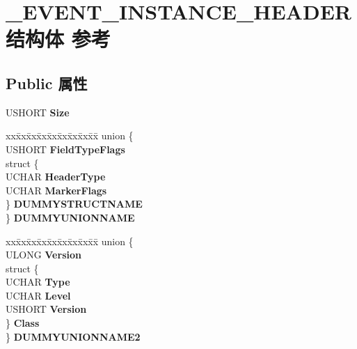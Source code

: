 \hypertarget{struct___e_v_e_n_t___i_n_s_t_a_n_c_e___h_e_a_d_e_r}{}\section{\+\_\+\+E\+V\+E\+N\+T\+\_\+\+I\+N\+S\+T\+A\+N\+C\+E\+\_\+\+H\+E\+A\+D\+E\+R结构体 参考}
\label{struct___e_v_e_n_t___i_n_s_t_a_n_c_e___h_e_a_d_e_r}
\subsection*{Public 属性}
\begin{DoxyCompactItemize}
\item 
\mbox{\label{struct___e_v_e_n_t___i_n_s_t_a_n_c_e___h_e_a_d_e_r_ae75f1a6dd8d0d347f318d45d325f159f}} 
U\+S\+H\+O\+RT {\bfseries Size}
\item 
\mbox{\label{struct___e_v_e_n_t___i_n_s_t_a_n_c_e___h_e_a_d_e_r_a184584d38a2dcb4fff67a9be91f792f4}} 
\begin{tabbing}
xx\=xx\=xx\=xx\=xx\=xx\=xx\=xx\=xx\=\kill
union \{\\
\>USHORT {\bfseries FieldTypeFlags}\\
\>struct \{\\
\>\>UCHAR {\bfseries HeaderType}\\
\>\>UCHAR {\bfseries MarkerFlags}\\
\>\} {\bfseries DUMMYSTRUCTNAME}\\
\} {\bfseries DUMMYUNIONNAME}\\

\end{tabbing}\item 
\mbox{\label{struct___e_v_e_n_t___i_n_s_t_a_n_c_e___h_e_a_d_e_r_a02be675b4058650a857f1fd11ecc9db0}} 
\begin{tabbing}
xx\=xx\=xx\=xx\=xx\=xx\=xx\=xx\=xx\=\kill
union \{\\
\>ULONG {\bfseries Version}\\
\>struct \{\\
\>\>UCHAR {\bfseries Type}\\
\>\>UCHAR {\bfseries Level}\\
\>\>USHORT {\bfseries Version}\\
\>\} {\bfseries Class}\\
\} {\bfseries DUMMYUNIONNAME2}\\


\end{tabbing}
\end{DoxyCompactItemize}
